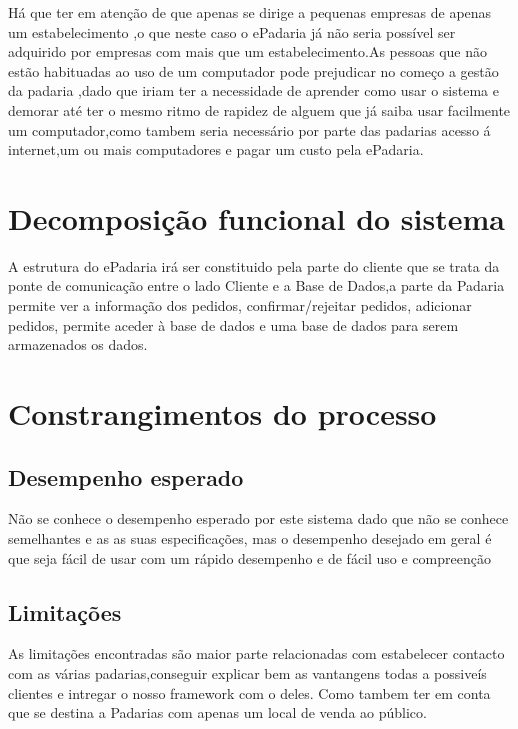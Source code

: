 Há que ter em atenção de que apenas se dirige a pequenas empresas de apenas um estabelecimento ,o que neste caso o ePadaria já não seria possível ser adquirido por empresas com mais que um estabelecimento.As pessoas que não estão habituadas ao uso de um computador pode prejudicar no começo a gestão da padaria ,dado que iriam ter a necessidade de aprender como usar o sistema e demorar até ter o mesmo ritmo de rapidez de alguem que já saiba usar facilmente um computador,como tambem seria necessário por parte das padarias acesso á internet,um ou mais computadores e pagar um custo pela ePadaria.\\


\section{Decomposição funcional do sistema}
A estrutura do ePadaria irá ser constituido pela parte do cliente que se trata da ponte de comunicação entre o lado Cliente e a Base de Dados,a parte da Padaria permite ver a informação dos pedidos, confirmar/rejeitar pedidos, adicionar pedidos, permite aceder à base de dados e uma base de dados para serem armazenados os dados.
\section{Constrangimentos do processo}
\subsection{Desempenho esperado}
Não se conhece o desempenho esperado por este sistema dado que não se conhece semelhantes e as as suas especificações, mas o desempenho desejado em geral é que seja fácil de usar com um rápido desempenho e de fácil uso e compreenção
\subsection{Limitações} 
As limitações encontradas são maior parte relacionadas com estabelecer contacto com as várias padarias,conseguir explicar bem as vantangens todas a possiveís clientes e intregar o nosso framework com o deles. Como tambem ter em conta que se destina a Padarias com apenas um local de venda ao público.